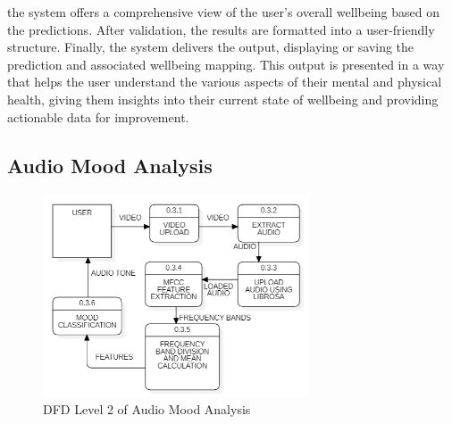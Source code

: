 the system offers a comprehensive view of the user's overall wellbeing based on the predictions. After validation, the results are formatted into a user-friendly structure. Finally, the system delivers the output, displaying or saving the prediction and associated wellbeing mapping. This output is presented in a way that helps the user understand the various aspects of their mental and physical health, giving them insights into their current state of wellbeing and providing actionable data for improvement.

\pagebreak

\subsection{Audio Mood Analysis}

\begin{figure}[h!]  
    \centering
    \includegraphics[width=0.7\textwidth]{Images/DFD L2 AM.png}  
    \caption{DFD Level 2 of Audio Mood Analysis}
    \label{dfdl671}  %
\end{figure}

